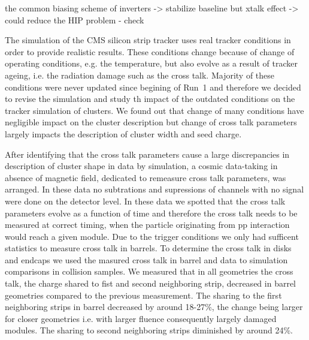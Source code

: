 the common biasing scheme of inverters -> stabilize baseline but xtalk effect -> could reduce the HIP problem - check 


The simulation of the CMS silicon strip tracker uses real tracker conditions in order to provide realistic results. These conditions change because of change of operating conditions, e.g. the temperature, but also evolve as a result of tracker ageing, i.e. the radiation damage such as the cross talk. Majority of these conditions were never updated since begining of Run~1 and therefore we decided to revise the simulation and study th impact of the outdated conditions on the tracker simulation of clusters. We found out that change of many conditions have negligible impact on the cluster description but change of cross talk parameters largely impacts the description of cluster width and seed charge.

After identifying that the cross talk parameters cause a large discrepancies in description of cluster shape in data by simulation, a cosmic data-taking in absence of magnetic field, dedicated to remeasure cross talk parameters, was arranged. In these data no subtrations and supressions of channels with no signal were done on the detector level. In these data we spotted that the cross talk parameters evolve as a function of time and therefore the cross talk needs to be measured at correct timing, when the particle originating from pp interaction would reach a given module. Due to the trigger conditions we only had sufficent statistics to measure cross talk in barrels. To determine the cross talk in disks and endcaps we used the masured cross talk in barrel and data to simulation comparisons in collision samples. We measured that in all geometries the cross talk, the charge shared to fist and second neighboring strip, decreased in barrel geometries compared to the previous measurement. The sharing to the first neighboring strips in barrel decreased by around 18-27\%, the change being larger for closer geometries i.e. with larger fluence consequently largely damaged modules. The sharing to second neighboring strips diminished by around 24\%.


